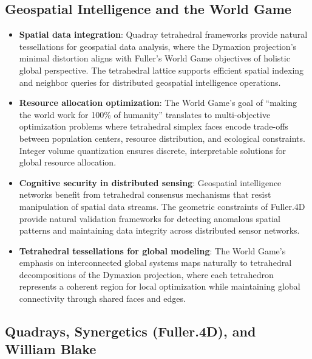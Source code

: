 \documentclass[
  10pt,
]{article}
\providecommand{\tightlist}{%
  \setlength{\itemsep}{0pt}\setlength{\parskip}{0pt}}
\begin{document}
\hypertarget{geospatial-intelligence-and-the-world-game}{%
\subsection{Geospatial Intelligence and the World
Game}\label{geospatial-intelligence-and-the-world-game}}

\begin{itemize}
\tightlist
\item
  \textbf{Spatial data integration}: Quadray tetrahedral frameworks
  provide natural tessellations for geospatial data analysis, where the
  Dymaxion projection's minimal distortion aligns with Fuller's World
  Game objectives of holistic global perspective. The tetrahedral
  lattice supports efficient spatial indexing and neighbor queries for
  distributed geospatial intelligence operations.
\item
  \textbf{Resource allocation optimization}: The World Game's goal of
  ``making the world work for 100\% of humanity'' translates to
  multi-objective optimization problems where tetrahedral simplex faces
  encode trade-offs between population centers, resource distribution,
  and ecological constraints. Integer volume quantization ensures
  discrete, interpretable solutions for global resource allocation.
\item
  \textbf{Cognitive security in distributed sensing}: Geospatial
  intelligence networks benefit from tetrahedral consensus mechanisms
  that resist manipulation of spatial data streams. The geometric
  constraints of Fuller.4D provide natural validation frameworks for
  detecting anomalous spatial patterns and maintaining data integrity
  across distributed sensor networks.
\item
  \textbf{Tetrahedral tessellations for global modeling}: The World
  Game's emphasis on interconnected global systems maps naturally to
  tetrahedral decompositions of the Dymaxion projection, where each
  tetrahedron represents a coherent region for local optimization while
  maintaining global connectivity through shared faces and edges.
\end{itemize}

\hypertarget{quadrays-synergetics-fuller.4d-and-william-blake}{%
\subsection{Quadrays, Synergetics (Fuller.4D), and William
Blake}\label{quadrays-synergetics-fuller.4d-and-william-blake}}
\end{document}
